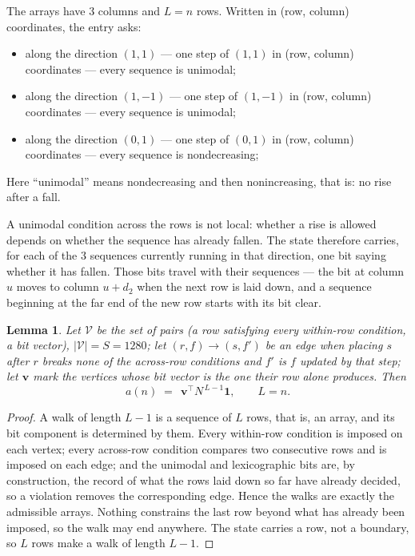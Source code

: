 \documentclass[11pt,a4paper]{article}
\theoremstyle{plain}
\newtheorem{lemma}[theorem]{Lemma}
\theoremstyle{definition}
\begin{document}
The arrays have $3$ columns and $L=n$ rows. Written in (row, column)
coordinates, the entry asks:
\begin{itemize}
\item along the direction $(1,1)$ --- one step of $(1,1)$ in (row, column) coordinates --- every sequence is unimodal;
\item along the direction $(1,-1)$ --- one step of $(1,-1)$ in (row, column) coordinates --- every sequence is unimodal;
\item along the direction $(0,1)$ --- one step of $(0,1)$ in (row, column) coordinates --- every sequence is nondecreasing;
\end{itemize}
Here ``unimodal'' means nondecreasing and then nonincreasing, that is: no rise after a fall.

A unimodal condition across the rows is not local: whether a
rise is allowed depends on whether the sequence has already fallen. The state therefore
carries, for each of the $3$ sequences currently running in that direction, one bit saying
whether it has fallen. Those bits travel with their sequences --- the bit at column $u$
moves to column $u+d_2$ when the next row is laid down, and a sequence beginning at the
far end of the new row starts with its bit clear.

\begin{lemma}\label{lem:walk}
Let $\mathcal V$ be the set of pairs (a row satisfying every within-row condition, a
bit vector), $|\mathcal V|=S=1280$; let $(r,f)\to(s,f')$ be an edge when placing $s$ after $r$
breaks none of the across-row conditions and $f'$ is $f$ updated by that step; let
$\mathbf{v}$ mark the vertices whose bit vector is the one their row alone produces.
Then
\[
a(n)\;=\;\,\mathbf{v}^{\!\top}N^{\,L-1}\mathbf{1},\qquad L=n.
\]
\end{lemma}

\begin{proof}
A walk of length $L-1$ is a sequence of $L$ rows, that is, an array, and its bit component
is determined by them. Every within-row condition is imposed on each vertex; every
across-row condition compares two consecutive rows and is imposed on each edge; and the
unimodal and lexicographic bits are, by construction, the record of what the rows laid down
so far have already decided, so a violation removes the corresponding edge. Hence the walks
are exactly the admissible arrays. Nothing constrains the last row beyond what has already
been imposed, so the walk may end anywhere. The state carries a row, not a boundary, so
$L$ rows make a walk of length $L-1$.
\end{proof}
\end{document}
